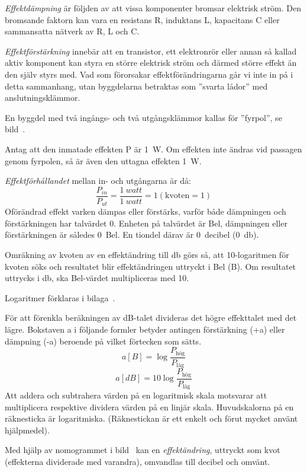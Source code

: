\emph{Effektdämpning} är följden av att vissa komponenter bromsar elektrisk
ström.
Den bromsande faktorn kan vara en resistans R, induktans L, kapacitans C eller
sammansatta nätverk av R, L och C.

\emph{Effektförstärkning} innebär att en transistor, ett elektronrör eller
annan så kallad aktiv komponent kan styra en större elektrisk ström och därmed
större effekt än den själv styrs med.
Vad som förorsakar effektförändringarna går vi inte in på i detta sammanhang,
utan byggdelarna betraktas som ''svarta lådor'' med anslutningsklämmor.

En byggdel med två ingångs- och två utgångsklämmor kallas för ''fyrpol'', se
bild~.


Antag att den inmatade effekten P är \qty{1}{\watt}.
Om effekten inte ändras vid passagen genom fyrpolen, så är även den uttagna
effekten \qty{1}{\watt}.

\emph{Effektförhållandet} mellan in- och utgångarna är då:
\[\dfrac{P_{in}}{P_{ut}} = \dfrac{1\ \textit{watt}}{1\ \textit{watt}} = 1 (\text{kvoten} = 1)\]
Oförändrad effekt varken dämpas eller förstärks, varför både dämpningen och
förstärkningen har talvärdet 0.
Enheten på talvärdet är Bel, dämpningen eller förstärkningen är således 0~Bel.
En tiondel därav är 0~decibel (\qty{0}{\decibel}).

Omräkning av kvoten av en effektändring till \unit{\decibel} görs så, att
10-logaritmen för kvoten söks och resultatet blir effektändringen uttryckt i Bel
(B).
Om resultatet uttrycks i \unit{\decibel}, ska Bel-värdet multipliceras med 10.

Logaritmer förklaras i bilaga~.

För att förenkla beräkningen av dB-talet divideras det högre effekttalet med det
lägre.
Bokstaven a i följande formler betyder antingen förstärkning (+a) eller
dämpning (-a) beroende på vilket förtecken som sätts.
\[a[B] = \log \dfrac{P_{\text{hög}}}{P_{\text{låg}}}\]
\[a[dB] = 10\log \dfrac{P_{\text{hög}}}{P_{\text{låg}}}\]
Att addera och subtrahera värden på en logaritmisk skala motsvarar att
multiplicera respektive dividera värden på en linjär skala.
Huvudskalorna på en räknesticka är logaritmiska.
(Räknestickan är ett enkelt och förut mycket använt hjälpmedel).

Med hjälp av nomogrammet i bild~ kan en
\emph{effektändring}, uttryckt som kvot (effekterna dividerade med varandra),
omvandlas till decibel och omvänt.



